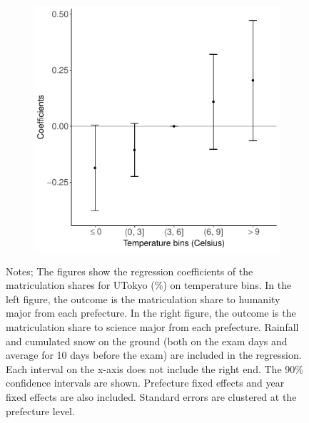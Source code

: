 \documentclass[10pt, pdfmx,hiresbb]{beamer}
\begin{document}
\begin{frame}
\begin{figure}
\begin{minipage}{0.43\textwidth}
\begin{figure}[h]
        \includegraphics[width = \textwidth]{../Output/images/reg_major_4.pdf}
        \centering
      \end{figure}
    \end{minipage}
    \tiny
    \begin{tablenotes}
    \item Notes;
      The figures show the regression coefficients of the matriculation shares for UTokyo (\%) on temperature bins.
      In the left figure, the outcome is the matriculation share to humanity major from each prefecture.
      In the right figure, the outcome is the matriculation share to science major from each prefecture.
      Rainfall and cumulated snow on the ground (both on the exam days and average for 10 days before the exam) are included in the regression.
      Each interval on the x-axis does not include the right end.
      The 90\% confidence intervals are shown.
      Prefecture fixed effects and year fixed effects are also included.
      Standard errors are clustered at the prefecture level.
    \end{tablenotes}
  \end{figure}
\end{frame}
\end{document}

